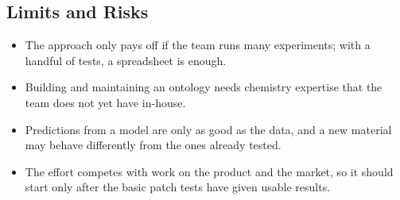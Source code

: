 \subsection{Limits and Risks}
\begin{itemize}[itemsep=0pt]
  \item The approach only pays off if the team runs many experiments; with a handful of tests, a
    spreadsheet is enough.
  \item Building and maintaining an ontology needs chemistry expertise that the team does not yet
    have in-house.
  \item Predictions from a model are only as good as the data, and a new material may behave
    differently from the ones already tested.
  \item The effort competes with work on the product and the market, so it should start only after
    the basic patch tests have given usable results.
\end{itemize}
